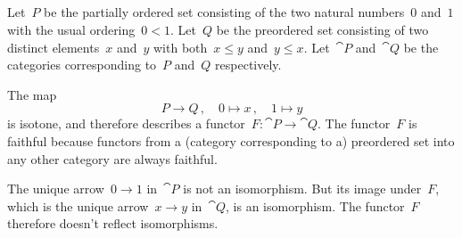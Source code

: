 \subsection{}

Let~$P$ be the partially ordered set consisting of the two natural numbers~$0$ and~$1$ with the usual ordering~$0 < 1$.
Let~$Q$ be the preordered set consisting of two distinct elements~$x$ and~$y$ with both~$x ≤ y$ and~$y ≤ x$.
Let~$\cat{P}$ and~$\cat{Q}$ be the categories corresponding to~$P$ and~$Q$ respectively.

The map
\[
	P \to Q \,,
	\quad
	0 \mapsto x \,,
	\quad
	1 \mapsto y
\]
is isotone, and therefore describes a functor~$F \colon \cat{P} \to \cat{Q}$.
The functor~$F$ is faithful because functors from a (category corresponding to a) preordered set into any other category are always faithful.

The unique arrow~$0 \to 1$ in~$\cat{P}$ is not an isomorphism.
But its image under~$F$, which is the unique arrow~$x \to y$ in~$\cat{Q}$, is an isomorphism.
The functor~$F$ therefore doesn’t reflect isomorphisms.

